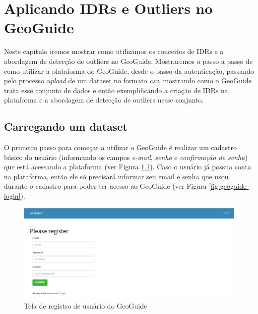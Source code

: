 \chapter{Aplicando IDRs e Outliers no GeoGuide}


Neste capítulo iremos mostrar como utilizamos os conceitos de IDRs e a abordagem de detecção de outliers no GeoGuide. Mostraremos o passo a passo de como utilizar a plataforma do GeoGuide, desde o passo da autenticação, passando pelo processo \textit{upload} de um dataset no formato \textit{csv}, mostrando como o GeoGuide trata esse conjunto de dados e então exemplificando a criação de IDRs na plataforma e a abordagem de detecção de outliers nesse conjunto.

\section{Carregando um dataset}

O primeiro passo para começar a utilizar o GeoGuide é realizar um cadastro básico do usuário (informando os campos \textit{e-mail}, \textit{senha} e \textit{confirmação de senha}) que está acessando a plataforma (ver Figura \ref{fig:geoguide-register}). Caso o usuário já possua conta na plataforma, então ele só precisará informar seu email e senha que usou durante o cadastro para poder ter acesso ao GeoGuide (ver Figura \ref{fig:geoguide-login}).

\begin{figure}[h]
	\centering
	\includegraphics[width=\textwidth]{images/geoguide-register.png}
	\caption{Tela de registro de usuário do GeoGuide}
	\label{fig:geoguide-register}
	\vspace{-10pt}
\end{figure}

